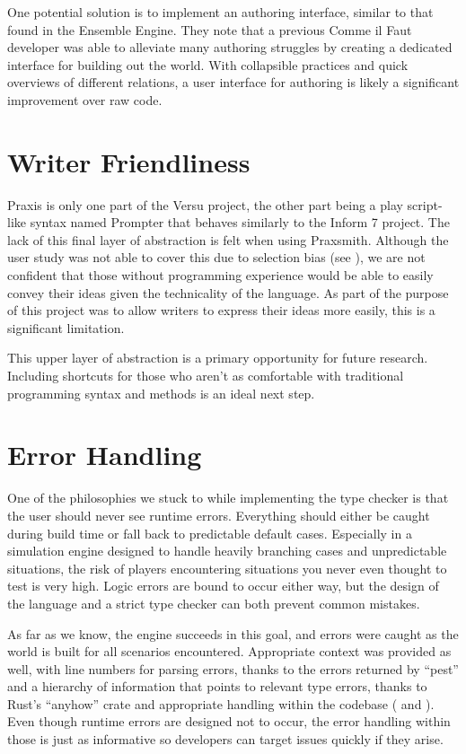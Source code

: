 One potential solution is to implement an authoring interface, similar to that found
in the Ensemble Engine. \cite{samuel_ensemble_2015} They note that a previous Comme il
Faut developer was able to alleviate many authoring struggles by creating a dedicated
interface for building out the world. With collapsible practices and quick overviews of
different relations, a user interface for authoring is likely a significant improvement
over raw code.

\section{Writer Friendliness} \label{sec:WriterFriendliness}

Praxis is only one part of the Versu project, the other part being a play script-like
syntax named Prompter that behaves similarly to the Inform 7 project.
\cite{nelson_prompter_2014} \cite{inform_7_inform_nodate} The lack of
this final layer of abstraction is felt when using Praxsmith. Although the user study
was not able to cover this due to selection bias (see ), we are
not confident that those without programming experience would be able to
easily convey their ideas given the technicality of the language. As part of the
purpose of this project was to allow writers to express their ideas more easily,
this is a significant limitation.

This upper layer of abstraction is a primary opportunity for future research.
Including shortcuts for those who aren't as comfortable with traditional
programming syntax and methods is an ideal next step.

\section{Error Handling} \label{sec:ErrorHandling}

One of the philosophies we stuck to while implementing the type checker is
that the user should never see runtime errors. Everything should either be caught
during build time or fall back to predictable default cases. Especially in a simulation
engine designed to handle heavily branching cases and unpredictable situations, the
risk of players encountering situations you never even thought to test is very high.
Logic errors are bound to occur either way, but the design of the language and a strict
type checker can both prevent common mistakes.

As far as we know, the engine succeeds in this goal, and errors were caught
as the world is built for all scenarios encountered. Appropriate context was provided
as well, with line numbers for parsing errors, thanks to the errors returned by ``pest''
and a hierarchy of information that points to relevant type errors, thanks to Rust's
``anyhow'' crate and appropriate handling within the codebase
( and ). Even though runtime
errors are designed not to occur, the error handling within those is just as informative
so developers can target issues quickly if they arise.

